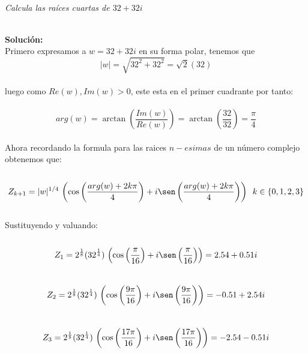 \documentclass[11pt,letterpaper]{article}
\begin{document}
\,\\
\begin{tcolorbox}[
	title = \textcolor{black}{\textcolor{white}{Problema 5}},]
\textit{Calcula las ra\'ices cuartas de $32+32i$
}
\end{tcolorbox}
\,\\
\textbf{Soluci\'on:}
    \,\\
    Primero expresamos a $w=32+32i$ en su forma polar, tenemos que\,\\
    \begin{equation*}
        |w|=\sqrt{32^2+32^2}=\sqrt{2}(32)
    \end{equation*}\,\\
    luego como $Re(w),Im(w)>0$, este esta en el primer cuadrante por tanto:\,\\
    \,\\
    \begin{equation*}
        arg(w)=\arctan\left(\frac{Im(w)}{Re(w)}\right)=\arctan\left(\frac{32}{32}\right)=\frac{\pi}{4}
    \end{equation*}\,\\
    Ahora recordando la formula para las raices $n-esimas$ de un n\'umero complejo obtenemos que:\,\\
    \,\\
    \begin{equation*}
        Z_{k+1}=|w|^{1/4}\,\left(\cos\left(\frac{arg(w)+2k\pi}{4}\right)+i\sen\left(\frac{arg(w)+2k\pi}{4}\right)\right)\,\,\,k\in\{0,1,2,3\}
    \end{equation*}\,\\
    Sustituyendo y valuando:\,\\
    \,\\
    \begin{equation*}
        Z_1=2^{\frac{1}{8}}(32^{\frac{1}{4}})\,\left(\cos\left(\frac{\pi}{16}\right)+i\sen\left(\frac{\pi}{16}\right)\right)=2.54+0.51i
    \end{equation*}
    \,\\
    \begin{equation*}
        Z_2=2^{\frac{1}{8}}(32^{\frac{1}{4}})\,\left(\cos\left(\frac{9\pi}{16}\right)+i\sen\left(\frac{9\pi}{16}\right)\right)=-0.51+2.54i
    \end{equation*}
\,\\
    \begin{equation*}
        Z_3=2^{\frac{1}{8}}(32^{\frac{1}{4}})\,\left(\cos\left(\frac{17\pi}{16}\right)+i\sen\left(\frac{17\pi}{16}\right)\right)=-2.54-0.51i
    \end{equation*}
\end{document}
